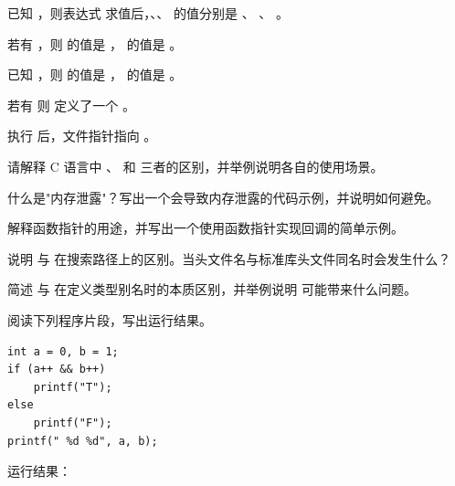 \documentclass[a4paper,11pt]{article}
\begin{document}
\examtitle


\anslines{0.1cm}

\q 已知 ，则表达式  求值后，、、 的值分别是 \fillblank 、 \fillblank 、 \fillblank 。

\q 若有 ，则  的值是 \fillblank ， 的值是 \fillblank 。

\q 已知 ，则  的值是 \fillblank ， 的值是 \fillblank 。

\q 若有  则  定义了一个 \fillblank 。

\q 执行  后，文件指针指向 \fillblank 。


\q 请解释 C 语言中 、 和  三者的区别，并举例说明各自的使用场景。
\anslines{1.5cm}

\q 什么是"内存泄露"？写出一个会导致内存泄露的代码示例，并说明如何避免。
\anslines{1.5cm}

\q 解释函数指针的用途，并写出一个使用函数指针实现回调的简单示例。
\anslines{1.5cm}

\q 说明  与  在搜索路径上的区别。当头文件名与标准库头文件同名时会发生什么？
\anslines{1.5cm}

\q 简述  与  在定义类型别名时的本质区别，并举例说明  可能带来什么问题。
\anslines{1.5cm}


阅读下列程序片段，写出运行结果。

\q
\begin{lstlisting}[language={[custom]C}]
int a = 0, b = 1;
if (a++ && b++)
    printf("T");
else
    printf("F");
printf(" %d %d", a, b);
\end{lstlisting}
运行结果：\underline{\hspace{3cm}}
\end{document}
